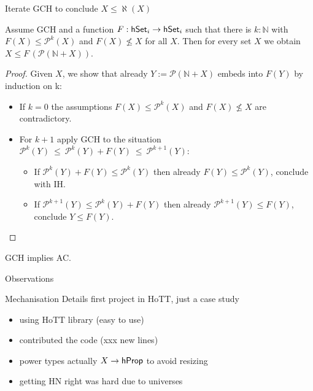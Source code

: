 \documentclass[xcolor=dvipsnames,compress,aspectratio=169,handout]{beamer}
\newcommand{\MBB}[1]{\ensuremath{\mathbb{#1}}\xspace}  %
\newcommand{\MCL}[1]{\ensuremath{\mathcal{#1}}\xspace} %
\newcommand{\Nat}{\MBB{N}}   %
\newcommand{\Pow}{\MCL P}
\begin{document}
\begin{frame}{Iterate GCH to conclude $X\le \aleph(X)$}

	
	\begin{theorem}
		Assume GCH and a function $F:\mathsf{hSet}_i\to\mathsf{hSet}_i$ such that there is $k:\Nat$ with $F(X)\le \Pow^k(X)$ and $F(X)\not\le X$ for all $X$.
		Then for every set $X$ we obtain $X\le F\,(\Pow(\Nat + X))$.
	\end{theorem}
	\vspace{-0.1cm}
	\begin{proof}
		Given $X$, we show that already $Y:=\Pow(\Nat + X)$ embeds into $F(Y)$ by induction on k:
		\begin{itemize}
			\vspace{0.2cm}
			\item
			If $k=0$ the assumptions $F(X)\le \Pow^k(X)$ and $F(X)\not\le X$ are contradictory.
			\vspace{0.2cm}
			\item
			For $k+1$ apply GCH to the situation $\Pow^{k}(Y)~\le~ \Pow^{k}(Y)+F(Y)~\le~ \Pow^{k+1}(Y)$:
			\begin{itemize}
			\vspace{0.2cm}
			\item
			If $\Pow^{k}(Y)+F(Y)\le \Pow^{k}(Y)$ then already $F(Y)\le \Pow^{k}(Y)$, conclude with IH.
			\vspace{0.2cm}
			\item
			If $\Pow^{k+1}(Y)\le \Pow^{k}(Y)+F(Y)$ then already $\Pow^{k+1}(Y)\le F(Y)$, conclude $Y\le F(Y)$.
			\qedhere
			\end{itemize}
		\end{itemize}
	\end{proof}
	\vspace{-0.1cm}
	\begin{corollary}
		GCH implies AC.
	\end{corollary}
\end{frame}

\begin{frame}
	\Huge
	\centering
	Observations
\end{frame}

\begin{frame}{Mechanisation Details}
	first project in HoTT, just a case study
	\begin{itemize}
		\item
		using HoTT library (easy to use)
		\item
		contributed the code (xxx new lines)
		\item
		power types actually $X\to\mathsf{hProp}$ to avoid resizing
		\item
		getting HN right was hard due to universes
	\end{itemize}
\end{frame}
\end{document}
